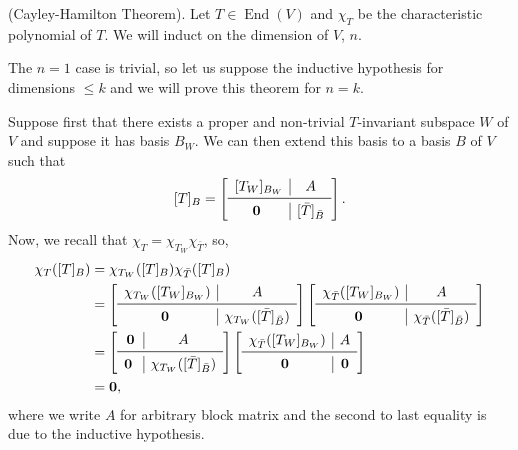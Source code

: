 \documentclass[
]{article}
\theoremstyle{definition}
\theoremstyle{definition}
\begin{document}
\proof (Cayley-Hamilton Theorem). Let \(T \in \mathop{\mathrm{End}}(V)\)
and \(\chi_T\) be the characteristic polynomial of \(T\). We will induct
on the dimension of \(V\), \(n\).

The \(n = 1\) case is trivial, so let us suppose the inductive
hypothesis for dimensions \(\le k\) and we will prove this theorem for
\(n = k\).

Suppose first that there exists a proper and non-trivial \(T\)-invariant
subspace \(W\) of \(V\) and suppose it has basis \(B_W\). We can then
extend this basis to a basis \(B\) of \(V\) such that \[[T]_B = 
    \left[
      \begin{array}{c|c}
        [T_W]_{B_W} & A \\
        \midrule
        \mathbf{0} & [\bar{T}]_{\bar{B}}
      \end{array}
      \right]. \] Now, we recall that
\(\chi_T = \chi_{T_W} \chi_{\bar{T}}\), so, \begin{align*}
    \chi_T([T]_B) & = \chi_{T_W}([T]_B) \chi_{\bar{T}}([T]_B)\\
    & = 
    \left[
      \begin{array}{c|c}
        \chi_{T_W}([T_W]_{B_W}) & A \\
        \midrule
        \mathbf{0} & \chi_{T_W}([\bar{T}]_{\bar{B}})
      \end{array}
    \right]
    \left[
      \begin{array}{c|c}
        \chi_{\bar{T}}([T_W]_{B_W}) & A \\
        \midrule
        \mathbf{0} & \chi_{\bar{T}}([\bar{T}]_{\bar{B}})
      \end{array}
    \right]\\
    & = 
    \left[
      \begin{array}{c|c}
        \mathbf{0} & A \\
        \midrule
        \mathbf{0} & \chi_{T_W}([\bar{T}]_{\bar{B}})
      \end{array}
    \right]
    \left[
      \begin{array}{c|c}
        \chi_{\bar{T}}([T_W]_{B_W}) & A \\
        \midrule
        \mathbf{0} & \mathbf{0}
      \end{array}
    \right]\\
    & = \mathbf{0},
  \end{align*} where we write \(A\) for arbitrary block matrix and the
second to last equality is due to the inductive hypothesis.
\end{document}
